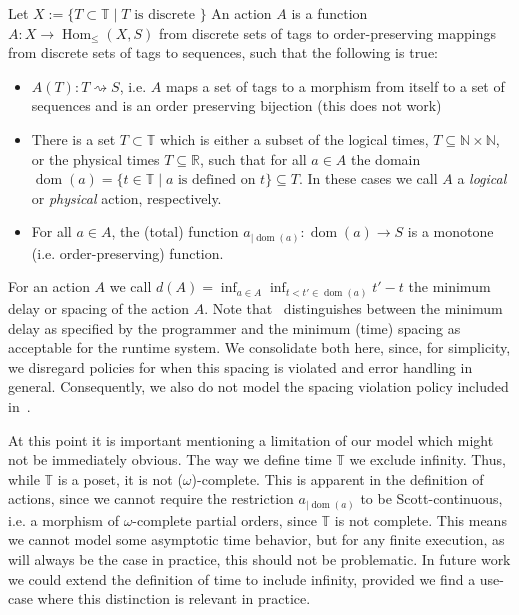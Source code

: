 \begin{defn}
    \label{defn:action}
Let $X := \{ T \subset \mathbb{T} \mid T \text{ is discrete }  \} $
 An action $A$ is a function $A: X  \rightarrow \operatorname{Hom}_{\leq}(X,S)$ from discrete sets of tags to order-preserving mappings from discrete sets of tags to sequences, such that the following is true:
\begin{itemize}
    \item $A(T) : T \rightsquigarrow S$, i.e. $A$ maps a set of tags to a morphism from itself to a set of sequences and is an order preserving bijection (this does not work)
    \item There is a set $T \subset \mathbb{T}$ which is either a subset of the logical times, $T \subseteq \mathbb{N} \times \mathbb{N}$, or the physical times $T \subseteq \mathbb{R}$, such that for all $a \in A$ the domain $\operatorname{dom}(a) = \{ t \in \mathbb{T} \mid a \text{ is defined on } t \} \subseteq T$.
    In these cases we call $A$ a \emph{logical} or \emph{physical} action, respectively.
    \item For all $a \in A$, the (total) function $a_{\big| \operatorname{dom}(a)}:\operatorname{dom}(a) \rightarrow S$ is a monotone (i.e. order-preserving) function.
\end{itemize}
\begin{defn}

For an action $A$ we call $d(A) = \operatorname{inf}_{a \in A} \operatorname{inf}_{t < t' \in \operatorname{dom}(a)} t' - t$ the minimum delay or spacing of the action $A$.
Note that~\cite{lohstroh_phdthesis} distinguishes between the minimum delay as specified by the programmer and the minimum (time) spacing as acceptable for the runtime system.
We consolidate both here, since, for simplicity, we disregard policies for when this spacing is violated and error handling in general.
Consequently, we also do not model the spacing violation policy included in~\cite{lohsroh_phdthesis}. 

At this point it is important mentioning a limitation of our model which might not be immediately obvious.
The way we define time $\mathbb{T}$ we exclude infinity. Thus, while $\mathbb{T}$ is a \ac{poset}, it is not ($\omega$)-complete.
This is apparent in the definition of actions, since we cannot require the restriction $a_{\big| \operatorname{dom}(a)}$ to be Scott-continuous, i.e. a morphism of $\omega$-complete partial orders, since $\mathbb{T}$ is not complete. 
This means we cannot model some asymptotic time behavior, but for any finite execution, as will always be the case in practice, this should not be problematic.
In future work we could extend the definition of time to include infinity, provided we find a use-case where this distinction is relevant in practice.


\end{defn}
\end{defn}
